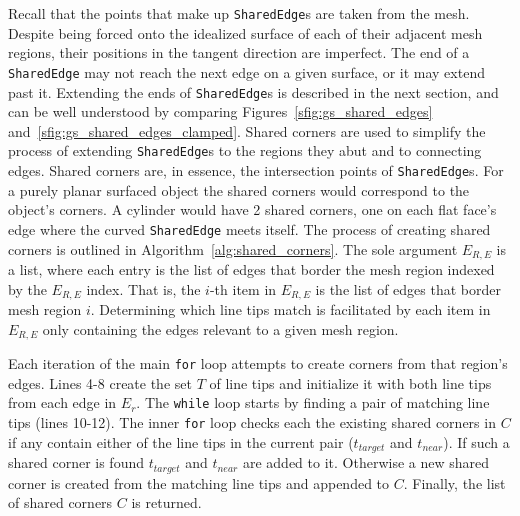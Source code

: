 Recall that the points that make up \verb|SharedEdge|s are taken from the mesh.
Despite being forced onto the idealized surface of each of their adjacent mesh regions, their positions in the tangent direction are imperfect.
The end of a \verb|SharedEdge| may not reach the next edge on a given surface, or it may extend past it.
Extending the ends of \verb|SharedEdge|s is described in the next section, and can be well understood by comparing Figures~\ref{sfig:gs_shared_edges} and~\ref{sfig:gs_shared_edges_clamped}.
Shared corners are used to simplify the process of extending \verb|SharedEdge|s to the regions they abut and to connecting edges.
Shared corners are, in essence, the intersection points of \verb|SharedEdge|s.
For a purely planar surfaced object the shared corners would correspond to the object's corners.
A cylinder would have 2 shared corners, one on each flat face's edge where the curved \verb|SharedEdge| meets itself.
The process of creating shared corners is outlined in Algorithm~\ref{alg:shared_corners}.
The sole argument $E_{R,E}$ is a list, where each entry is the list of edges that border the mesh region indexed by the $E_{R,E}$ index.
That is, the $i$-th item in $E_{R,E}$ is the list of edges that border mesh region $i$.
Determining which line tips match is facilitated by each item in $E_{R,E}$ only containing the edges relevant to a given mesh region.

Each iteration of the main \verb|for| loop attempts to create corners from that region's edges.
Lines 4-8 create the set $T$ of line tips and initialize it with both line tips from each edge in $E_r$.
The \verb|while| loop starts by finding a pair of matching line tips (lines 10-12).
The inner \verb|for| loop checks each the existing shared corners in $C$ if any contain either of the line tips in the current pair ($t_{target}$ and $t_{near}$).
If such a shared corner is found $t_{target}$ and $t_{near}$ are added to it.
Otherwise a new shared corner is created from the matching line tips and appended to $C$.
Finally, the list of shared corners $C$ is returned.

